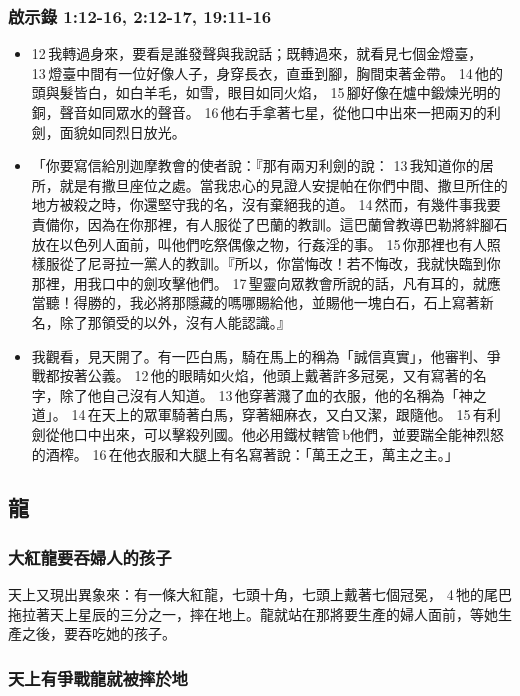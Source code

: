\subsubsection{啟示錄 1:12-16, 2:12-17, 19:11-16}
\begin{itemize} 
\itemsep-.25em
\item 12 我轉過身來，要看是誰發聲與我說話；既轉過來，就看見七個金燈臺， 13 燈臺中間有一位好像人子，身穿長衣，直垂到腳，胸間束著金帶。 14 他的頭與髮皆白，如白羊毛，如雪，眼目如同火焰， 15 腳好像在爐中鍛煉光明的銅，聲音如同眾水的聲音。 16 他右手拿著七星，從他口中出來一把兩刃的利劍，面貌如同烈日放光。
\item 「你要寫信給別迦摩教會的使者說：『那有兩刃利劍的說： 13 我知道你的居所，就是有撒旦座位之處。當我忠心的見證人安提帕在你們中間、撒旦所住的地方被殺之時，你還堅守我的名，沒有棄絕我的道。 14 然而，有幾件事我要責備你，因為在你那裡，有人服從了巴蘭的教訓。這巴蘭曾教導巴勒將絆腳石放在以色列人面前，叫他們吃祭偶像之物，行姦淫的事。 15 你那裡也有人照樣服從了尼哥拉一黨人的教訓。『所以，你當悔改！若不悔改，我就快臨到你那裡，用我口中的劍攻擊他們。 17 聖靈向眾教會所說的話，凡有耳的，就應當聽！得勝的，我必將那隱藏的嗎哪賜給他，並賜他一塊白石，石上寫著新名，除了那領受的以外，沒有人能認識。』
\item 我觀看，見天開了。有一匹白馬，騎在馬上的稱為「誠信真實」，他審判、爭戰都按著公義。 12 他的眼睛如火焰，他頭上戴著許多冠冕，又有寫著的名字，除了他自己沒有人知道。 13 他穿著濺了血的衣服，他的名稱為「神之道」。 14 在天上的眾軍騎著白馬，穿著細麻衣，又白又潔，跟隨他。 15 有利劍從他口中出來，可以擊殺列國。他必用鐵杖轄管 b他們，並要踹全能神烈怒的酒榨。 16 在他衣服和大腿上有名寫著說：「萬王之王，萬主之主。」
\end{itemize} 





\subsection{龍}
\subsubsection{大紅龍要吞婦人的孩子}

天上又現出異象來：有一條大紅龍，七頭十角，七頭上戴著七個冠冕， 4 牠的尾巴拖拉著天上星辰的三分之一，摔在地上。龍就站在那將要生產的婦人面前，等她生產之後，要吞吃她的孩子。

\subsubsection{天上有爭戰龍就被摔於地}

